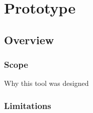 \chapter{Prototype}

\section{Overview}
\label{sec:Overview}


\subsection{Scope}
\label{sec:Scope}

Why this tool was designed

\subsection{Limitations}
\label{sec:Limitations}
